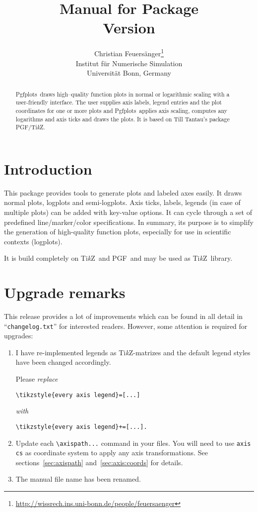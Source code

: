 \documentclass[a4paper]{article}
\author{%
	Christian Feuers\"anger\footnote{\url{http://wissrech.ins.uni-bonn.de/people/feuersaenger}}\\%
	Institut f\"ur Numerische Simulation\\
	Universit\"at Bonn, Germany}
\title{Manual for Package \PGFPlots\\{\small Version \pgfplotsversion}}
\newcommand\Tikz{Ti\textit kZ}
\newcommand\PGF{PGF}
\newcommand\PGFPlots{Pgfplots}
\begin{document}
\maketitle
\begin{abstract}%
\PGFPlots\ draws high--quality function plots in normal or logarithmic scaling with a user-friendly interface. The user supplies axis labels, legend entries and the plot coordinates for one or more plots and \PGFPlots\ applies axis scaling, computes any logarithms and axis ticks and draws the plots. It is based on Till Tantau's package \PGF/\Tikz.
\end{abstract}
\tableofcontents
\section{Introduction}
This package provides tools to generate plots and labeled axes easily. It draws normal plots, logplots and semi-logplots. Axis ticks, labels, legends (in case of multiple plots) can be added with key-value options. It can cycle through a set of predefined line/marker/color specifications. In summary, its purpose is to simplify the generation of high-quality function plots, especially for use in scientific contexts (logplots).

It is build completely on \Tikz\ and \PGF\ and may be used as \Tikz\ library. 

\section{Upgrade remarks}
This release provides a lot of improvements which can be found in all detail in ``\texttt{changelog.txt}'' for interested readers. However, some attention is required for upgrades:
\begin{enumerate}
	\item I have re-implemented legends as \Tikz-matrizes and the default legend styles have been changed accordingly.

	Please \emph{replace} 
	\begin{lstlisting}
\tikzstyle{every axis legend}=[...]
	\end{lstlisting}
	\emph{with} 
\begin{lstlisting}
\tikzstyle{every axis legend}+=[...].
\end{lstlisting}

	\item Update each \lstinline!\axispath...! command in your files. You will need to use \lstinline!axis cs! as coordinate system to apply any axis transformations. See sections~\ref{sec:axispath} and~\ref{sec:axis:coords} for details.

	\item The manual file name has been renamed.
\end{enumerate}

%
%
%
%
%


\end{document}
